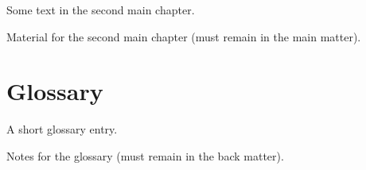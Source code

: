 \documentclass{book}
\theoremstyle{plain}
\begin{document}
Some text in the second main chapter.

\begin{toappendix}
  Material for the second main chapter (must remain in the main matter).
\end{toappendix}

\backmatter

\chapter{Glossary}

A short glossary entry.

\begin{toappendix}
  Notes for the glossary (must remain in the back matter).
\end{toappendix}
\end{document}

